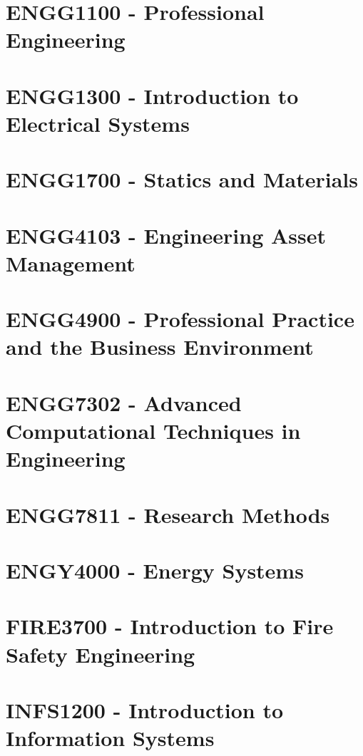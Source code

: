 \documentclass[a4paper,12pt]{report}
\begin{document}
\hypertarget{ENGG1100}{\section{ENGG1100 - Professional Engineering}}

\hypertarget{ENGG1300}{\section{ENGG1300 - Introduction to Electrical Systems}}

\hypertarget{ENGG1700}{\section{ENGG1700 - Statics and Materials}}

\hypertarget{ENGG4103}{\section{ENGG4103 - Engineering Asset Management}}

\hypertarget{ENGG4900}{\section{ENGG4900 - Professional Practice and the Business Environment}}

\hypertarget{ENGG7302}{\section{ENGG7302 - Advanced Computational Techniques in Engineering}}

\hypertarget{ENGG7811}{\section{ENGG7811 - Research Methods}}

\hypertarget{ENGY4000}{\section{ENGY4000 - Energy Systems}}

\hypertarget{FIRE3700}{\section{FIRE3700 - Introduction to Fire Safety Engineering}}

\hypertarget{INFS1200}{\section{INFS1200 - Introduction to Information Systems}}
\end{document}
